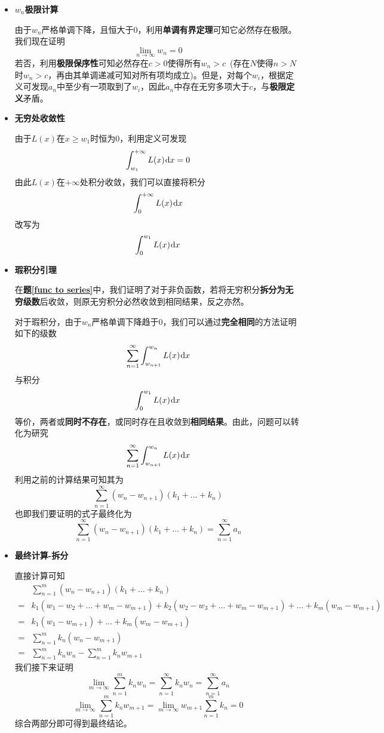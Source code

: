 \documentclass[a4paper,UTF8,fontset=windows,AutoFakeBold]{ctexart}
\newcommand*{\dr}{\hspace{0.07em}\mathrm{d}}
\newcommand*{\suminf}[1][n=1]{\sum_{#1}^\infty}
\theoremstyle{ex}
\newcommand{\exref}[1]{\textbf{题\;\ref{#1}\;}}
\begin{document}
\begin{framed}
{\begin{itemize}
        与之前类似讨论，可以发现对正整数$n$有
        $$\forall x\in[w_{n+1},w_n),\quad L(x)=k_1+\dots+k_n$$

        \item \textbf{$w_n$极限计算}

        由于$w_n$严格单调下降，且恒大于0，利用\textbf{单调有界定理}可知它必然存在极限。我们现在证明
        $$\lim_{n\to\infty}w_n=0$$
        若否，利用\textbf{极限保序性}可知必然存在$c>0$使得所有$w_n>c$\ (存在$N$使得$n>N$时$w_n>c$，再由其单调递减可知对所有项均成立)。但是，对每个$w_i$，根据定义可发现$a_n$中至少有一项取到了$w_i$，因此$a_n$中存在无穷多项大于$c$，与\textbf{极限定义}矛盾。

        \item \textbf{无穷处收敛性}
        
        由于$L(x)$在$x\ge w_1$时恒为0，利用定义可发现
        $$\int_{w_1}^{+\infty}L(x)\dr x=0$$
        由此$L(x)$在$+\infty$处积分收敛，我们可以直接将积分
        $$\int_0^{+\infty}L(x)\dr x$$
        改写为
        $$\int_0^{w_1}L(x)\dr x$$
        
        \item \textbf{瑕积分引理}
        
        在\exref{func to series}中，我们证明了对于非负函数，若将无穷积分\textbf{拆分为无穷级数}后收敛，则原无穷积分必然收敛到相同结果，反之亦然。

        对于瑕积分，由于$w_n$严格单调下降趋于0，我们可以通过\textbf{完全相同}的方法证明如下的级数
        $$\suminf\int_{w_{n+1}}^{w_n}L(x)\dr x$$
        与积分
        $$\int_0^{w_1}L(x)\dr x$$
        等价，两者或\textbf{同时不存在}，或同时存在且收敛到\textbf{相同结果}。由此，问题可以转化为研究
        $$\suminf\int_{w_{n+1}}^{w_n}L(x)\dr x$$
        利用之前的计算结果可知其为
        $$\suminf(w_n-w_{n+1})(k_1+\dots+k_n)$$
        也即我们要证明的式子最终化为
        $$\suminf(w_n-w_{n+1})(k_1+\dots+k_n)=\suminf a_n$$

        \item \textbf{最终计算-拆分}
        
        直接计算可知
        $$\begin{aligned}&\sum_{n=1}^m(w_n-w_{n+1})(k_1+\dots+k_n)\\=&k_1(w_1-w_2+\dots+w_m-w_{m+1})+k_2(w_2-w_3+\dots+w_m-w_{m+1})+\dots+k_m(w_m-w_{m+1})\\=&k_1(w_1-w_{m+1})+\dots+k_m(w_m-w_{m+1})\\=&\sum_{n=1}^mk_n(w_n-w_{m+1})\\=&\sum_{n=1}^mk_nw_n-\sum_{n=1}^mk_nw_{m+1}\end{aligned}$$
        我们接下来证明
        $$\lim_{m\to\infty}\sum_{n=1}^mk_nw_n=\suminf k_nw_n=\suminf a_n$$
        $$\lim_{m\to\infty}\sum_{n=1}^mk_nw_{m+1}=\lim_{m\to\infty}w_{m+1}\sum_{n=1}^mk_n=0$$
        综合两部分即可得到最终结论。


\end{itemize}}
\end{framed}
\end{document}
